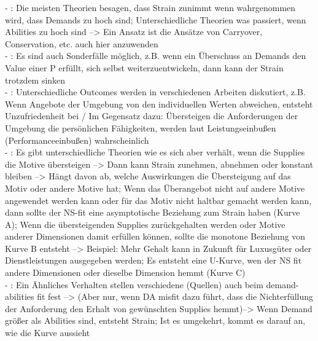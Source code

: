 - \cite[S. 6]{edwards:1996}: Die meisten Theorien besagen, dass Strain zunimmt wenn wahrgenommen wird, dass Demands zu hoch sind; Unterschiedliche Theorien was passiert, wenn Abilities zu hoch sind --> Ein Ansatz ist die Ansätze von Carryover, Conservation, etc. auch hier anzuwenden \\

- \cite[S. 9]{edwards:1996}: Es sind auch Sonderfälle möglich, z.B. wenn ein Überschuss an Demands den Value einer P erfüllt, sich selbst weiterzuentwickeln, dann kann der Strain trotzdem sinken \\
- \cite[S. 4]{edwards:1990}: Unterschiedliche Outcomes werden in verschiedenen Arbeiten diskutiert, z.B. Wenn Angebote der Umgebung von den individuellen Werten abweichen, entsteht Unzufriedenheit bei \textcite{locke:1969} / Im Gegensatz dazu: Übersteigen die Anforderungen der Umgebung die persönlichen Fähigkeiten, werden laut \textcite{theoryOfBehaviorInOrganizations:1980} Leistungseinbußen (Performanceeinbußen) wahrscheinlich \\
- \cite[S. 21]{edwards:2008}: Es gibt unterschiedliche Theorien wie es sich aber verhält, wenn die Supplies die Motive übersteigen --> Dann kann Strain zunehmen, abnehmen oder konstant bleiben --> Hängt davon ab, welche Auswirkungen die Übersteigung auf das Motiv oder andere Motive hat; Wenn das Überangebot nicht auf andere Motive angewendet werden kann oder für das Motiv nicht haltbar gemacht werden kann, dann sollte der NS-fit eine asymptotische Beziehung zum Strain haben (Kurve A); Wenn die übersteigenden Supplies zurückgehalten werden oder Motive anderer Dimensionen damit erfüllen können, sollte die monotone Beziehung von Kurve B entsteht --> Beispiel: Mehr Gehalt kann in Zukunft für Luxusgüter oder Dienstleistungen ausgegeben werden; Es entsteht eine U-Kurve, wen der NS fit andere Dimensionen oder dieselbe Dimension hemmt (Kurve C) \\
- \cite[S. 22f.]{edwards:2008}: Ein Ähnliches Verhalten stellen verschiedene (Quellen) auch beim demand-abilities fit fest --> (Aber nur, wenn DA misfit dazu führt, dass die Nichterfüllung der Anforderung den Erhalt von gewünschten Supplies hemmt)--> Wenn Demand größer als Abilities sind, entsteht Strain; Ist es umgekehrt, kommt es darauf an, wie die Kurve aussieht \\
